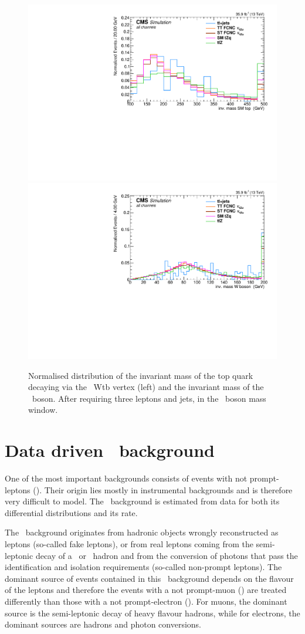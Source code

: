 \begin{figure}[tbph]
	\centering
	\includegraphics[width=0.49\linewidth]{5_EventSelection/Figures/3lepcontrol_dilep_SMTopMass_all_Normalized}
	\includegraphics[width=0.49\linewidth]{5_EventSelection/Figures/3lepcontrol_dilep_WbosonMass_all_Normalized}
	\caption{Normalised distribution of the invariant mass of the top quark  decaying via the \SM\ Wtb vertex (left) and the invariant mass of the \PW\ boson. After requiring three leptons and jets, in the \PZ\ boson mass window.}
	\label{fig:topmasss}
\end{figure}
 
\section{Data driven \NPL\ background}
\label{sec:NPL}
 One of the most important backgrounds consists of events with not prompt-leptons (\NPL). Their origin lies mostly in instrumental backgrounds and is therefore very difficult to model. The \NPL\ background  is estimated from data for both its differential distributions and its rate. 

The \NPL\ background  originates from hadronic objects wrongly reconstructed as leptons (so-called fake leptons), or from real leptons coming from the semi-leptonic decay of a \Pbottom\ or \Pcharm\ hadron and from the conversion of photons that pass the identification and isolation requirements (so-called non-prompt leptons). The dominant source of events contained in this \NPL\ background  depends on the flavour of the leptons and therefore the events with a not prompt-muon (\NPM) are treated differently than those with a not prompt-electron (\NPE). For muons, the dominant source is the semi-leptonic decay of heavy flavour hadrons, while for electrons, the dominant sources are hadrons and photon conversions. 

